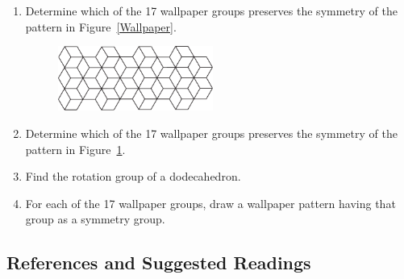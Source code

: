 {\begin{enumerate}
\begin{enumerate}
 \bf\item\rm
The quaternion group, $Q_8$, cannot be written as a semidirect product. 
 
 \bf\item\rm
$E(2)$ is the semidirect product of $O(2)$ by $H$, where $H$ consists
of all translations in ${\Bbb R}^2$. 
 
\end{enumerate}
 
 
 
\bf\item\rm
Determine which of the 17 wallpaper groups preserves the symmetry of
the pattern in Figure~\ref{Wallpaper}.  
 
\begin{figure}[htb]
\begin{center}
\centerline {
\includegraphics[width=2in]{p6m}
}
\end{center}
\caption{}
\label{For17}
\end{figure}
 
\bf\item\rm
Determine which of the 17 wallpaper groups preserves the symmetry of
the pattern in Figure~\ref{For17}.  
 
 
 
\bf\item\rm
Find the rotation group of a dodecahedron.
 
  
 
\bf\item\rm
For each of the 17 wallpaper groups, draw a wallpaper pattern having
that group as a symmetry group.  
 
\end{enumerate}
}
 
 
 
\subsection*{References and Suggested Readings}
 
 
 
